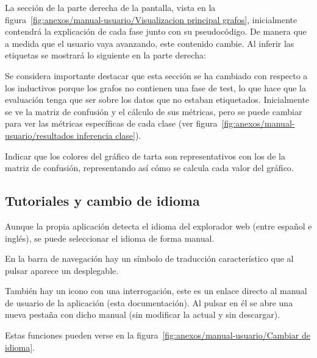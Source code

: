 
La sección de la parte derecha de la pantalla, vista en la figura~\ref{fig:anexos/manual-usuario/Visualizacion principal grafos}, inicialmente contendrá la explicación de cada fase junto con su pseudocódigo. De manera que a medida que el usuario vaya avanzando, este contenido cambie. Al inferir las etiquetas se mostrará lo siguiente en la parte derecha:


Se considera importante destacar que esta sección se ha cambiado con respecto a los inductivos porque los grafos no contienen una fase de test, lo que hace que la evaluación tenga que ser sobre los datos que no estaban etiquetados. Inicialmente se ve la matriz de confusión y el cálculo de sus métricas, pero se puede cambiar para ver las métricas específicas de cada clase (ver figura~\ref{fig:anexos/manual-usuario/resultados inferencia clase}).


Indicar que los colores del gráfico de tarta son representativos con los de la matriz de confusión, representando así cómo se calcula cada valor del gráfico.
\subsection{Tutoriales y cambio de idioma}

Aunque la propia aplicación detecta el idioma del explorador web (entre español e inglés), se puede seleccionar el idioma de forma manual.

En la barra de navegación hay un símbolo de traducción característico que al pulsar aparece un desplegable.

También hay un icono con una interrogación, este es un enlace directo al manual de usuario de la aplicación (esta documentación). Al pulsar en él se abre una nueva pestaña con dicho manual (sin modificar la actual y sin descargar).

Estas funciones pueden verse en la figura~\ref{fig:anexos/manual-usuario/Cambiar
de idioma}.


